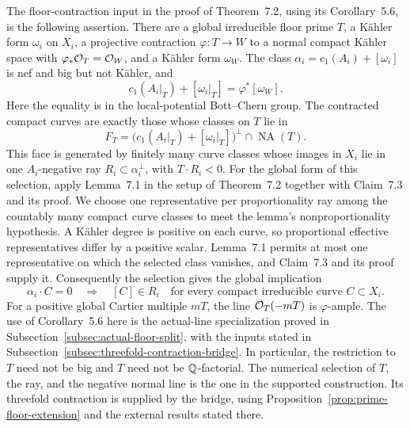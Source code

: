 The floor-contraction input in the proof of
Theorem~7.2, using its Corollary~5.6, is the following assertion.
There are a global irreducible floor prime \(T\), a K\"ahler form
\(\omega_i\) on \(X_i\), a projective contraction
\(\varphi:T\to W\) to a normal compact K\"ahler space with
\(\varphi_*\mathcal O_T=\mathcal O_W\), and a K\"ahler form \(\omega_W\).
The class \(\alpha_i=c_1(A_i)+[\omega_i]\) is nef and big but not
K\"ahler, and
\begin{equation}\label{eq:floor-contraction-class}
 c_1(A_i|_T)+[\omega_i|_T]=\varphi^*[\omega_W].
\end{equation}
Here the equality is in the local-potential Bott--Chern group.  The
contracted compact curves are exactly those whose classes on \(T\) lie in
\[
 F_T=\bigl(c_1(A_i|_T)+[\omega_i|_T]\bigr)^\perp
       \cap\operatorname{NA}(T).
\]
This face is generated by finitely many curve classes whose images in
\(X_i\) lie in one \(A_i\)-negative ray
\(R_i\subset\alpha_i^\perp\), with \(T\cdot R_i<0\).
For the global form of this selection, apply Lemma~7.1 in the setup of
Theorem~7.2 together with Claim~7.3 and its proof.  We choose one
representative per proportionality ray among the countably many compact
curve classes to meet the lemma's nonproportionality hypothesis.  A
K\"ahler degree is positive on each curve, so proportional effective
representatives differ by a positive scalar.  Lemma~7.1 permits at most
one representative on which the selected class vanishes, and Claim~7.3
and its proof supply it.  Consequently the selection gives the global
implication
\begin{equation}\label{eq:global-support-zero-ray}
 \alpha_i\cdot C=0\quad\Longrightarrow\quad [C]\in R_i
 \quad\text{for every compact irreducible curve }C\subset X_i.
\end{equation}
For a positive global Cartier multiple
\(mT\), the line \(\mathcal O_T(-mT)\) is \(\varphi\)-ample.
The use of Corollary~5.6 here is the actual-line specialization proved
in Subsection~\ref{subsec:actual-floor-split}, with the inputs stated in
Subsection~\ref{subsec:threefold-contraction-bridge}.
In particular, the restriction to \(T\) need not be big and \(T\)
need not be \(\mathbb Q\)-factorial.  The numerical selection of \(T\),
the ray, and the negative normal line is the one in the supported
construction.  Its threefold contraction is supplied by the bridge,
using Proposition~\ref{prop:prime-floor-extension} and the external
results stated there.

